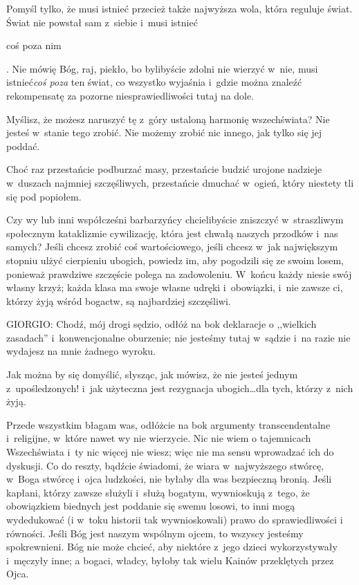 \documentclass[oneside,polish,11pt,sfheadings]{mwbk}
\begin{document}
 
Pomyśl tylko, że musi istnieć przecież także najwyższa wola, która reguluje świat. Świat nie powstał sam z~siebie i~musi
istnieć \begin{itshape}coś poza nim \end{itshape}. Nie mówię Bóg, raj, piekło, bo bylibyście
zdolni nie wierzyć w~nie, musi istnieć\textit{coś poza} ten świat, co wszystko wyjaśnia i~gdzie można znaleźć
rekompensatę za pozorne niesprawiedliwości tutaj na dole. 

 
Myślisz, że możesz naruszyć tę z~góry ustaloną harmonię wszechświata? Nie jesteś w~stanie tego zrobić. Nie możemy zrobić
nic innego, jak tylko się jej poddać. 

 
Choć raz przestańcie podburzać masy, przestańcie budzić urojone nadzieje w~duszach najmniej szczęśliwych, przestańcie
dmuchać w~ogień, który niestety tli się pod popiołem. 

 
Czy wy lub inni współcześni barbarzyńcy chcielibyście zniszczyć w~straszliwym społecznym kataklizmie cywilizację, która
jest chwałą naszych przodków i~nas samych? Jeśli chcesz zrobić coś wartościowego, jeśli chcesz w~jak największym
stopniu ulżyć cierpieniu ubogich, powiedz im, aby pogodzili się ze swoim losem, ponieważ prawdziwe szczęście polega na
zadowoleniu. W~końcu każdy niesie swój własny krzyż; każda klasa ma swoje własne udręki i~obowiązki, i~nie zawsze ci,
którzy żyją wśród bogactw, są najbardziej szczęśliwi. 




 
\noindent GIORGIO: Chodź, mój drogi sędzio, odłóż na bok deklaracje o ,,wielkich zasadach'' i~konwencjonalne oburzenie; nie jesteśmy
tutaj w~sądzie i~na razie nie wydajesz na mnie żadnego wyroku. 

 
Jak można by się domyślić, słysząc, jak mówisz, że nie jesteś jednym z~upośledzonych! i~jak użyteczna jest rezygnacja
ubogich\ldots dla tych, którzy z~nich żyją. 

 
Przede wszystkim błagam was, odłóżcie na bok argumenty transcendentalne i~religijne, w~które nawet wy nie wierzycie. Nic
nie wiem o tajemnicach Wszechświata i~ty nic więcej nie wiesz; więc nie ma sensu wprowadzać ich do dyskusji. Co do
reszty, bądźcie świadomi, że wiara w~najwyższego stwórcę, w~Boga stwórcę i~ojca ludzkości, nie byłaby dla was
bezpieczną bronią. Jeśli kapłani, którzy zawsze służyli i~służą bogatym, wywnioskują z~tego, że obowiązkiem biednych
jest poddanie się swemu losowi, to inni mogą wydedukować (i w~toku historii tak wywnioskowali) prawo do sprawiedliwości
i równości. Jeśli Bóg jest naszym wspólnym ojcem, to wszyscy jesteśmy spokrewnieni. Bóg nie może chcieć, aby niektóre z~jego dzieci wykorzystywały i~męczyły inne; a bogaci, władcy, byłoby tak wielu Kainów przeklętych przez Ojca. 
\end{document}
